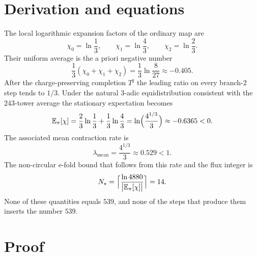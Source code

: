 \section{Derivation and equations}

The local logarithmic expansion factors of the ordinary map are
\[
\chi_0=\ln\frac13,\qquad
\chi_1=\ln\frac43,\qquad
\chi_2=\ln\frac23.
\]
Their uniform average is the a priori negative number
\begin{equation}
\frac13(\chi_0+\chi_1+\chi_2)
=\frac13\ln\frac{8}{27}
\approx -0.405.
\label{eq:unres-avg}
\end{equation}
After the charge-preserving completion \(T^\sharp\) the leading ratio on every
branch-2 step tends to \(1/3\). Under the natural \(3\)-adic equidistribution
consistent with the \(243\)-tower average the stationary expectation becomes
\begin{equation}
\mathbb{E}_\pi[\chi]
=\frac23\ln\frac13+\frac13\ln\frac43
=\ln\Bigl(\frac{4^{1/3}}{3}\Bigr)
\approx -0.6365
<0.
\label{eq:Epi-nogo}
\end{equation}
The associated mean contraction rate is
\begin{equation}
\lambda_{\mathrm{mean}}
=\frac{4^{1/3}}{3}
\approx 0.529
<1.
\label{eq:lmean}
\end{equation}
The non-circular e-fold bound that follows from this rate and the flux integer is
\begin{equation}
N_\star
=\Bigl\lceil
\frac{\ln 4880}{\bigl|\mathbb{E}_\pi[\chi]\bigr|}
\Bigr\rceil
=14.
\label{eq:Nstar-nogo}
\end{equation}
None of these quantities equals \(539\), and none of the steps that produce them
inserts the number \(539\).

\section{Proof}

